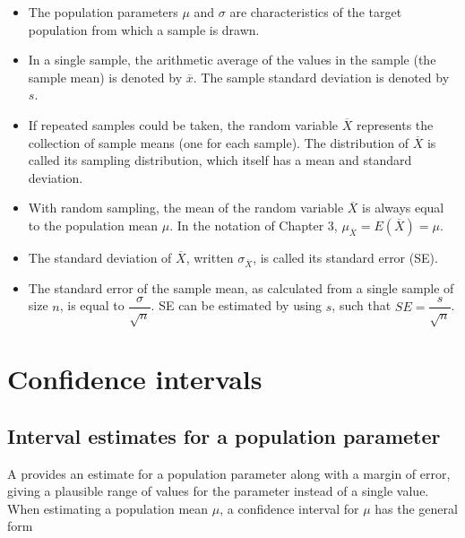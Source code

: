 \begin{spacing}{1.5}
\begin{itemize}
\setlength{\itemsep}{0mm}	
	\item The population parameters $\mu$ and $\sigma$ are characteristics of the target population from which a sample is drawn. 
	
	\item In a single sample, the arithmetic average of the values in the sample (the sample mean) is denoted by $\overline{x}$. The sample standard deviation is denoted by $s$. 
	
	\item If repeated samples could be taken, the random variable $\overline{X}$ represents the collection of sample means (one for each sample). The distribution of $\overline{X}$ is called its sampling distribution, which itself has a mean and standard deviation. 
	
	\item With random sampling, the mean of the random variable $\overline{X}$ is always equal to the population mean $\mu$.  In the notation of Chapter 3, $\mu_{\overline{X}} = E(\overline{X}) = \mu$.
	
	\item  The standard deviation of $\overline{X}$, written $\sigma_{\overline{X}}$, is called its standard error (SE). 
	
	\item The standard error of the sample mean, as calculated from a single sample of size $n$, is equal to $\dfrac{\sigma}{\sqrt{n}}$. SE can be estimated by using $s$, such that $SE = \dfrac{s}{\sqrt{n}}$.
	
\end{itemize}



\section[Confidence intervals]{Confidence intervals} %
\label{confidenceIntervals}
\subsection{Interval estimates for a population parameter}

A  provides an estimate for a population parameter along with a margin of error, giving a plausible range of values for the parameter instead of a single value. When estimating a population mean $\mu$, a confidence interval for $\mu$ has the general form


\end{spacing}
